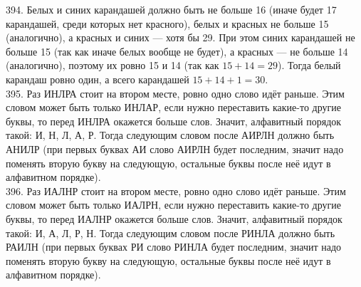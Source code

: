 394. Белых и синих карандашей должно быть не больше 16 (иначе будет 17 карандашей, среди которых нет красного), белых и красных не больше 15 (аналогично), а красных и синих --- хотя бы 29. При этом синих карандашей не больше 15 (так как иначе белых вообще не будет), а красных --- не больше 14 (аналогично), поэтому их ровно 15 и 14 (так как $15+14=29$). Тогда белый карандаш ровно один, а всего карандашей $15+14+1=30.$\\
395. Раз ИНЛРА стоит на втором месте, ровно одно слово идёт раньше. Этим словом может быть только ИНЛАР, если нужно переставить какие-то другие буквы, то перед ИНЛРА окажется больше слов. Значит, алфавитный порядок такой: И, Н, Л, А, Р. Тогда следующим словом после АИРЛН должно быть АНИЛР (при первых буквах АИ слово АИРЛН будет последним, значит надо поменять вторую букву на следующую, остальные буквы после неё идут в алфавитном порядке).\\
396. Раз ИАЛНР стоит на втором месте, ровно одно слово идёт раньше. Этим словом может быть только ИАЛРН, если нужно переставить какие-то другие буквы, то перед ИАЛНР окажется больше слов. Значит, алфавитный порядок такой: И, А, Л, Р, Н. Тогда следующим словом после РИНЛА должно быть РАИЛН (при первых буквах РИ слово РИНЛА будет последним, значит надо поменять вторую букву на следующую, остальные буквы после неё идут в алфавитном порядке).
 